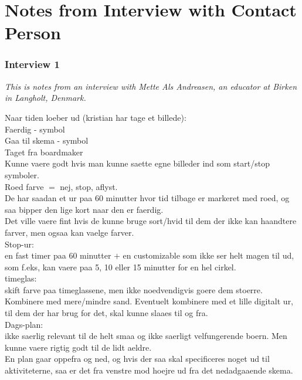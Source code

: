 \section{Notes from Interview with Contact Person}
\label{InterviewMette}
\subsubsection*{Interview 1}
\textit{This is notes from an interview with Mette Als Andreasen, an educator at Birken in Langholt, Denmark.}

Naar tiden loeber ud (kristian har tage et billede):\\
Faerdig - symbol\\
Gaa til skema - symbol\\
Taget fra boardmaker\\

Kunne vaere godt hvis man kunne saette egne billeder ind som start/stop symboler.\\

Roed farve $=$ nej, stop, aflyst.\\

De har saadan et ur paa 60 minutter hvor tid tilbage er markeret med roed, og saa bipper den lige kort naar den er faerdig.\\
  Det ville vaere fint hvis de kunne bruge sort/hvid til dem der ikke kan haandtere farver, men ogsaa kan vaelge farver.\\

Stop-ur:\\
en fast timer paa 60 minutter $+$ en customizable som ikke ser helt magen til ud, som f.eks, kan vaere paa 5, 10 eller 15 minutter for en hel cirkel.\\

timeglas:\\
skift farve paa timeglassene, men ikke noedvendigvis goere dem stoerre. Kombinere med mere/mindre sand. Eventuelt kombinere med et lille digitalt ur, til dem der har brug for det, skal kunne slaaes til og fra.\\

Dags-plan:\\
ikke saerlig relevant til de helt smaa og ikke saerligt velfungerende boern. Men kunne vaere rigtig godt til de lidt aeldre.\\
   En plan gaar oppefra og ned, og hvis der saa skal specificeres noget ud til aktiviteterne, saa er det fra venstre mod hoejre ud fra det nedadgaaende skema.\\

